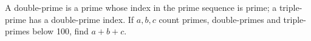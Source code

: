 A double-prime is a prime whose index in the prime sequence is prime; a triple-prime has a double-prime index. If $a,b,c$ count primes, double-primes and triple-primes below 100, find $a+b+c$.
